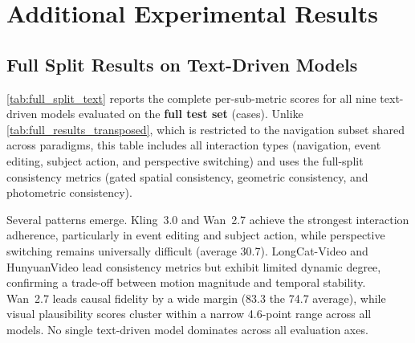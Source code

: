 \section{Additional Experimental Results}
\label{app:results}

\subsection{Full Split Results on Text-Driven Models}
\label{app:full_split_text}

\cref{tab:full_split_text} reports the complete per-sub-metric scores for all nine text-driven models evaluated on the \textbf{full test set} (\numvideo cases). Unlike \cref{tab:full_results_transposed}, which is restricted to the navigation subset shared across paradigms, this table includes all interaction types (navigation, event editing, subject action, and perspective switching) and uses the full-split consistency metrics (gated spatial consistency, geometric consistency, and photometric consistency).

Several patterns emerge. Kling~3.0 and Wan~2.7 achieve the strongest interaction adherence, particularly in event editing and subject action, while perspective switching remains universally difficult (average 30.7). LongCat-Video and HunyuanVideo lead consistency metrics but exhibit limited dynamic degree, confirming a trade-off between motion magnitude and temporal stability. Wan~2.7 leads causal fidelity by a wide margin (83.3 \vs the 74.7 average), while visual plausibility scores cluster within a narrow 4.6-point range across all models. No single text-driven model dominates across all evaluation axes.

